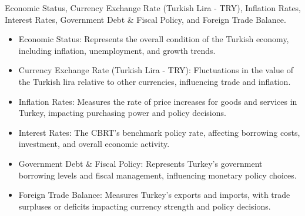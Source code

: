  Economic Status, Currency Exchange Rate (Turkish Lira - TRY), Inflation Rates, Interest Rates, Government Debt \& Fiscal Policy, and Foreign Trade Balance.

\begin{itemize}
    \item Economic Status: Represents the overall condition of the Turkish economy, including inflation, unemployment, and growth trends.
    \item Currency Exchange Rate (Turkish Lira - TRY): Fluctuations in the value of the Turkish lira relative to other currencies, influencing trade and inflation.
    \item Inflation Rates: Measures the rate of price increases for goods and services in Turkey, impacting purchasing power and policy decisions.
    \item Interest Rates: The CBRT's benchmark policy rate, affecting borrowing costs, investment, and overall economic activity.
    \item Government Debt \& Fiscal Policy: Represents Turkey’s government borrowing levels and fiscal management, influencing monetary policy choices.
    \item Foreign Trade Balance: Measures Turkey’s exports and imports, with trade surpluses or deficits impacting currency strength and policy decisions.
\end{itemize}

